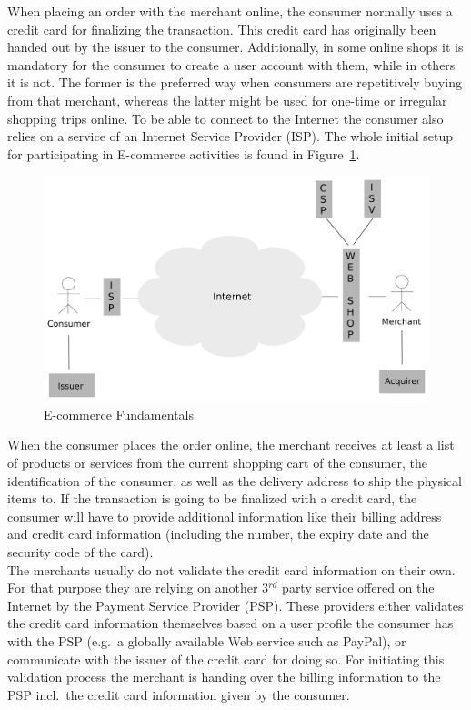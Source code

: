When placing an order with the merchant online, the consumer normally uses a credit card for finalizing the transaction. This credit card has originally been handed out by the issuer to the consumer. Additionally, in some online shops it is mandatory for the consumer to create a user account with them, while in others it is not. The former is the preferred way when consumers are repetitively buying from that merchant, whereas the latter might be used for one-time or irregular shopping trips online. To be able to connect to the Internet the consumer also relies on a service of an Internet Service Provider (\gls{ISP}). The whole initial setup for participating in \gls{E-commerce} activities is found in Figure~\ref{fig:images_ecommerce_scenario}.\@

\begin{figure}[H]
	\centering
		\includegraphics[width=0.9\columnwidth]{images/e-commerce-scenario.pdf}
	\caption{\gls{E-commerce} Fundamentals}
\label{fig:images_ecommerce_scenario}
\end{figure}

When the consumer places the order online, the merchant receives at least a list of products or services from the current shopping cart of the consumer, the identification of the consumer, as well as the delivery address to ship the physical items to. If the transaction is going to be finalized with a credit card, the consumer will have to provide additional information like their billing address and credit card information (including the number, the expiry date and the security code of the card). \\

The merchants usually do not validate the credit card information on their own. For that purpose they are relying on another 3$^{rd}$ party service offered on the Internet by the Payment Service Provider (\gls{PSP}). These providers either validates the credit card information themselves based on a user profile the consumer has with the \gls{PSP} (e.g.\ a globally available Web service such as PayPal), or communicate with the issuer of the credit card for doing so. For initiating this validation process the merchant is handing over the billing information to the \gls{PSP} incl.\ the credit card information given by the consumer. \\

